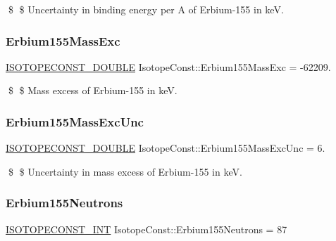 \$ \$ Uncertainty in binding energy per A of Erbium-\/155 in keV. \mbox{\label{group___isotope_const-_erbium-_er155_ga826271f91eead86830cbafcabed50c73}} 
\subsubsection{\texorpdfstring{Erbium155\+Mass\+Exc}{Erbium155MassExc}}
{\footnotesize\ttfamily \mbox{\hyperlink{group___isotope_const-_macros_ga8f45a7272ce02c0b4c65c44636ed719a}{I\+S\+O\+T\+O\+P\+E\+C\+O\+N\+S\+T\+\_\+\+D\+O\+U\+B\+LE}} Isotope\+Const\+::\+Erbium155\+Mass\+Exc = -\/62209.}

\$ \$ Mass excess of Erbium-\/155 in keV. \mbox{\label{group___isotope_const-_erbium-_er155_gae74e69fe135014579fc79de735c4120d}} 
\subsubsection{\texorpdfstring{Erbium155\+Mass\+Exc\+Unc}{Erbium155MassExcUnc}}
{\footnotesize\ttfamily \mbox{\hyperlink{group___isotope_const-_macros_ga8f45a7272ce02c0b4c65c44636ed719a}{I\+S\+O\+T\+O\+P\+E\+C\+O\+N\+S\+T\+\_\+\+D\+O\+U\+B\+LE}} Isotope\+Const\+::\+Erbium155\+Mass\+Exc\+Unc = 6.}

\$ \$ Uncertainty in mass excess of Erbium-\/155 in keV. \mbox{\label{group___isotope_const-_erbium-_er155_ga62b8da5c9e3ec9d173ea30e18b9574f8}} 
\subsubsection{\texorpdfstring{Erbium155\+Neutrons}{Erbium155Neutrons}}
{\footnotesize\ttfamily \mbox{\hyperlink{group___isotope_const-_macros_ga5f18360b3e99483a35c32d789e62621c}{I\+S\+O\+T\+O\+P\+E\+C\+O\+N\+S\+T\+\_\+\+I\+NT}} Isotope\+Const\+::\+Erbium155\+Neutrons = 87}


